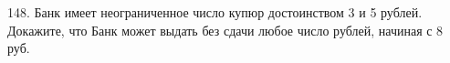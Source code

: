 148. Банк имеет неограниченное число купюр достоинством 3 и 5 рублей.  Докажите, что Банк может выдать без сдачи любое число рублей, начиная с 8 руб.\\
